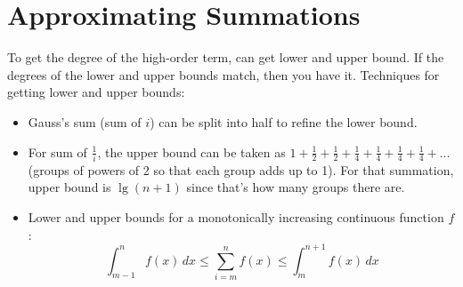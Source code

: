\section{Approximating Summations}

To get the degree of the high-order term, can get lower and upper bound. If the degrees of the lower and upper bounds match, then you have it. Techniques for getting lower and upper bounds:
\begin{itemize}
    \item Gauss's sum (sum of $i$) can be split into half to refine the lower bound.
    \item For sum of $\frac 1 i$, the upper bound can be taken as $1 + \frac 1 2 + \frac 1 2 + \frac 1 4 + \frac 1 4 + \frac 1 4 + \frac 1 4 + ...$ (groups of powers of 2 so that each group adds up to 1). For that summation, upper bound is $\lg(n+1)$ since that's how many groups there are.
    \item Lower and upper bounds for a monotonically increasing continuous function $f$:
    \[\int_{m-1}^n f(x)\,dx \leq \sum_{i=m}^n f(x) \leq \int_m^{n+1} f(x)\,dx\]
\end{itemize}
